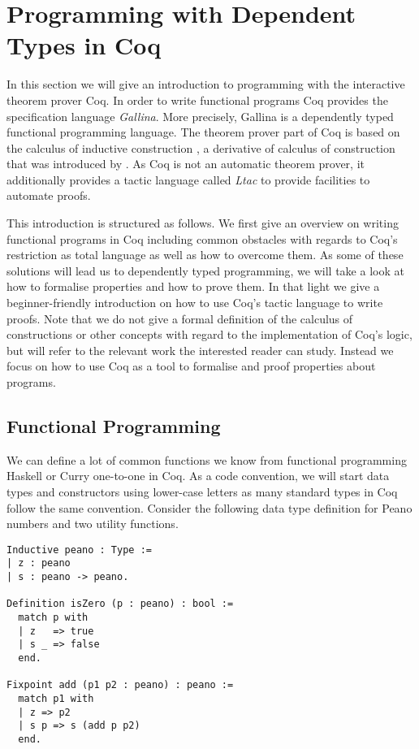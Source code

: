 \section{Programming with Dependent Types in Coq}
\label{sec:progDT}

In this section we will give an introduction to programming with the interactive theorem prover Coq.
In order to write functional programs Coq provides the specification language \emph{Gallina}.
More precisely, Gallina is a dependently typed functional programming language.
The theorem prover part of Coq is based on the calculus of inductive construction \citep{coquand1988inductively}, a derivative of calculus of construction that was introduced by \citet{coquand1986calculus}.
As Coq is not an automatic theorem prover, it additionally provides a tactic language called \emph{Ltac} to provide facilities to automate proofs.

This introduction is structured as follows.
We first give an overview on writing functional programs in Coq including common obstacles with regards to Coq's restriction as total language as well as how to overcome them.
As some of these solutions will lead us to dependently typed programming, we will take a look at how to formalise properties and how to prove them.
In that light we give a beginner-friendly introduction on how to use Coq's tactic language to write proofs.
Note that we do not give a formal definition of the calculus of constructions or other concepts with regard to the implementation of Coq's logic, but will refer to the relevant work the interested reader can study.
Instead we focus on how to use Coq as a tool to formalise and proof properties about programs.

\subsection{Functional Programming}

We can define a lot of common functions we know from functional programming Haskell or Curry one-to-one in Coq.
As a code convention, we will start data types and constructors using lower-case letters as many standard types in Coq follow the same convention.
Consider the following data type definition for Peano numbers and two utility functions.

\begin{verbatim}
Inductive peano : Type :=
| z : peano
| s : peano -> peano.

Definition isZero (p : peano) : bool :=
  match p with
  | z   => true
  | s _ => false
  end.

Fixpoint add (p1 p2 : peano) : peano :=
  match p1 with
  | z => p2
  | s p => s (add p p2)
  end.
\end{verbatim}

